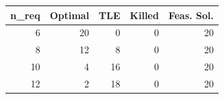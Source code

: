 
\begin{tabular}{rrrrr}
\toprule
n\_req & Optimal & TLE & Killed & Feas. Sol.\\
\midrule
6 & 20 & 0 & 0 & 20\\
8 & 12 & 8 & 0 & 20\\
10 & 4 & 16 & 0 & 20\\
12 & 2 & 18 & 0 & 20\\
\bottomrule
\end{tabular}
